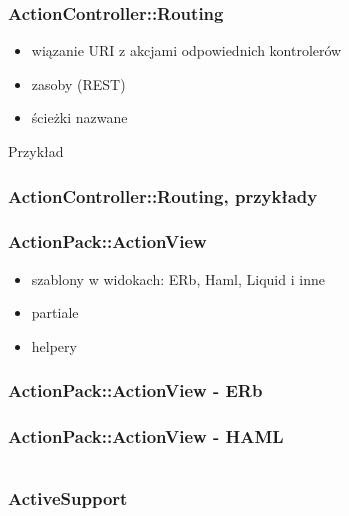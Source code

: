 \documentclass[12t]{beamer}
\begin{document}
\begin{frame}
  \frametitle{ActionController::Routing}
  \begin{itemize}
  \item wiązanie URI z akcjami odpowiednich kontrolerów
  \item zasoby (REST)
  \item ścieżki nazwane
  \end{itemize}
  \begin{block}{Przykład}
    
  \end{block}
\end{frame}

\begin{frame}
  \frametitle{ActionController::Routing, przykłady}
  \begin{scriptsize}
    
  \end{scriptsize}
\end{frame}


\begin{frame}
  \frametitle{ActionPack::ActionView}
  \begin{itemize}
  \item szablony w widokach: ERb, Haml, Liquid i inne
  \item partiale
  \item helpery
  \end{itemize}
\end{frame}

\begin{frame}[fragile]
  \frametitle{ActionPack::ActionView - ERb}
  
\end{frame}

\begin{frame}[fragile]
  \frametitle{ActionPack::ActionView - HAML}
  \begin{footnotesize}
  \begin{columns}[T]
    \begin{column}{4cm}
      
    \end{column}
    \begin{column}{6cm}
      
    \end{column}
  \end{columns}
  \end{footnotesize}
\end{frame}

\begin{frame}
  \frametitle{ActiveSupport}
  
\end{frame}
\end{document}
